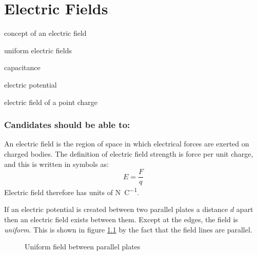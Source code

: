 \documentclass[main.tex]{subfiles}
\begin{document}
\chapter{Electric Fields}
\begin{content}
  \item concept of an electric field
  \item uniform electric fields
  \item capacitance
  \item electric potential
  \item electric field of a point charge
\end{content}
\subsection{Candidates should be able to:}

An electric field is the region of space in which electrical forces are exerted on charged bodies. The definition of electric field strength is force per unit charge, and this is written in symbols as:
\[ E=\frac{F}{q} \]
Electric field therefore has units of \si{\newton\per\coulomb}.


If an electric potential is created between two parallel plates a distance $d$ apart then an electric field exists between them. Except at the edges, the field is \emph{uniform}. This is shown in figure \ref{parallelplates} by the fact that the field lines are parallel.

\begin{figure}[ht]
  \begin{center}
  \end{center}
  \caption{Uniform field between parallel plates}
  \label{parallelplates}
\end{figure}
\end{document}
